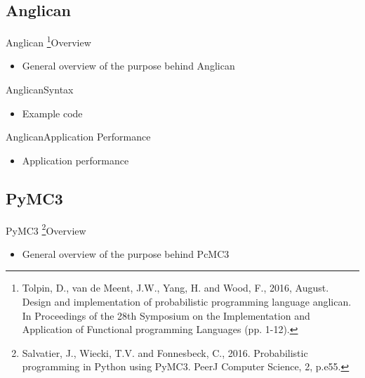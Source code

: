 \documentclass[AERbeamer%
              ,optEnglish%
              ,optBiber%
              ,optBibstyleAlphabetic%
              ,optBeamerClassicFormat%
              ]{AERlatex}%
\begin{document}
\subsection{Anglican}
\begin{frame}[c]{Anglican \footnote{Tolpin, D., van de Meent, J.W., Yang, H. and Wood, F., 2016, August. Design
                                    and implementation of probabilistic programming language anglican. In Proceedings
                                    of the 28th Symposium on the Implementation and Application of Functional
                                    programming Languages (pp. 1-12).}}{Overview}
    \centering
    \begin{itemize}
        \item General overview of the purpose behind Anglican
    \end{itemize}
\end{frame}


\begin{frame}[c]{Anglican}{Syntax}
    \centering
    \begin{itemize}
        \item Example code
    \end{itemize}
\end{frame}


\begin{frame}[c]{Anglican}{Application Performance}
    \centering
    \begin{itemize}
        \item Application performance
    \end{itemize}
\end{frame}


\subsection{PyMC3}
\begin{frame}[c]{PyMC3 \footnote{Salvatier, J., Wiecki, T.V. and Fonnesbeck, C., 2016. Probabilistic programming
                                 in Python using PyMC3. PeerJ Computer Science, 2, p.e55.}}{Overview}
    \centering
    \begin{itemize}
        \item General overview of the purpose behind PcMC3
    \end{itemize}
\end{frame}
\end{document}
